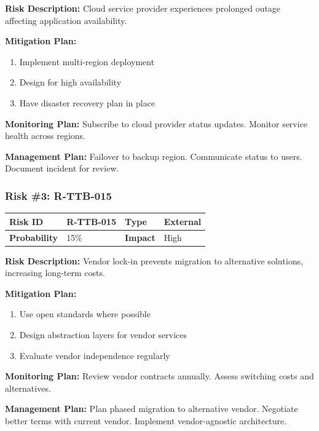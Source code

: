 \textbf{Risk Description:} Cloud service provider experiences prolonged outage affecting application availability.

\textbf{Mitigation Plan:}
\begin{enumerate}[leftmargin=*]
    \item Implement multi-region deployment
    \item Design for high availability
    \item Have disaster recovery plan in place
\end{enumerate}

\textbf{Monitoring Plan:} Subscribe to cloud provider status updates. Monitor service health across regions.

\textbf{Management Plan:} Failover to backup region. Communicate status to users. Document incident for review.

\subsubsection{Risk \#3: R-TTB-015}

\begin{table}[h]
\small
\begin{tabular}{|p{3cm}|p{3cm}|p{3cm}|p{3cm}|}
\hline
\textbf{Risk ID} & R-TTB-015 & \textbf{Type} & External \\
\hline
\textbf{Probability} & 15\% & \textbf{Impact} & High \\
\hline
\end{tabular}
\end{table}

\textbf{Risk Description:} Vendor lock-in prevents migration to alternative solutions, increasing long-term costs.

\textbf{Mitigation Plan:}
\begin{enumerate}[leftmargin=*]
    \item Use open standards where possible
    \item Design abstraction layers for vendor services
    \item Evaluate vendor independence regularly
\end{enumerate}

\textbf{Monitoring Plan:} Review vendor contracts annually. Assess switching costs and alternatives.

\textbf{Management Plan:} Plan phased migration to alternative vendor. Negotiate better terms with current vendor. Implement vendor-agnostic architecture.

